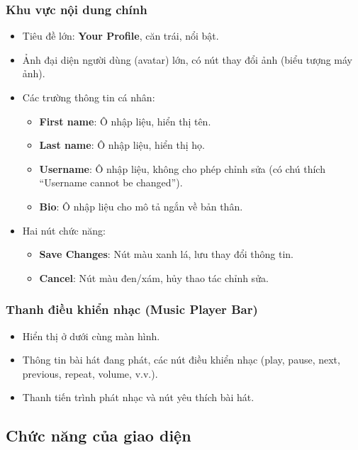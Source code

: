 \documentclass{book}
\begin{document}
\subsubsection{Khu vực nội dung chính}
\begin{itemize}
    \item Tiêu đề lớn: \textbf{Your Profile}, căn trái, nổi bật.
    \item Ảnh đại diện người dùng (avatar) lớn, có nút thay đổi ảnh (biểu tượng máy ảnh).
    \item Các trường thông tin cá nhân:
    \begin{itemize}
        \item \textbf{First name}: Ô nhập liệu, hiển thị tên.
        \item \textbf{Last name}: Ô nhập liệu, hiển thị họ.
        \item \textbf{Username}: Ô nhập liệu, không cho phép chỉnh sửa (có chú thích “Username cannot be changed”).
        \item \textbf{Bio}: Ô nhập liệu cho mô tả ngắn về bản thân.
    \end{itemize}
    \item Hai nút chức năng:
    \begin{itemize}
        \item \textbf{Save Changes}: Nút màu xanh lá, lưu thay đổi thông tin.
        \item \textbf{Cancel}: Nút màu đen/xám, hủy thao tác chỉnh sửa.
    \end{itemize}
\end{itemize}

\subsubsection{Thanh điều khiển nhạc (Music Player Bar)}
\begin{itemize}
    \item Hiển thị ở dưới cùng màn hình.
    \item Thông tin bài hát đang phát, các nút điều khiển nhạc (play, pause, next, previous, repeat, volume, v.v.).
    \item Thanh tiến trình phát nhạc và nút yêu thích bài hát.
\end{itemize}

\subsection{Chức năng của giao diện}
\end{document}
